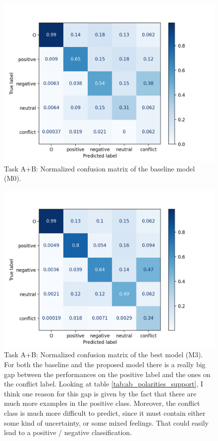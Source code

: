 \documentclass[11pt,a4paper]{article}
\begin{document}
	\begin{figure}[H]
		\centering
		\includegraphics[width=1\columnwidth]{M0_ab_confusion_matrix.png}
		\caption{Task A+B: Normalized confusion matrix of the baseline model (M0).}
		\label{fig:cm_M0}
	\end{figure}
	
	\begin{figure}[H]
		\centering
		\includegraphics[width=1\columnwidth]{M3_ab_confusion_matrix.png}
		\caption{Task A+B: Normalized confusion matrix of the best model (M3). For both the baseline and the proposed model there is a really big gap between the performances on the positive label and the ones on the conflict label. Looking at table \ref{tab:ab_polarities_support}, I think one reason for this gap is given by the fact that there are much more examples in the positive class. Moreover, the conflict class is much more difficult to predict, since it must contain either some kind of uncertainty, or some mixed feelings. That could easily lead to a positive / negative classification.}
		\label{fig:cm_M3}
	\end{figure}
\end{document}
